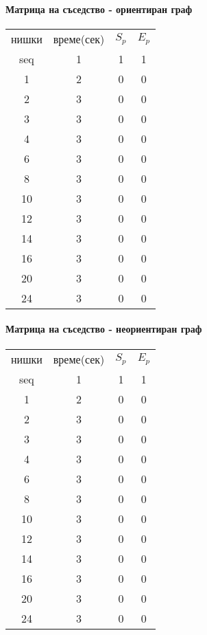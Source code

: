 \paragraph*{Матрица на съседство - ориентиран граф}

\begin{center}
\begin{tabular}{ c c c c }
  нишки & време(сек) & $S_p$ & $E_p$ \\
  seq & 1 & 1 & 1 \\
  1 & 2 & 0 & 0 \\
  2 & 3 & 0 & 0 \\
  3 & 3 & 0 & 0 \\
  4 & 3 & 0 & 0 \\
  6 & 3 & 0 & 0 \\
  8 & 3 & 0 & 0 \\
  10 & 3 & 0 & 0 \\
  12 & 3 & 0 & 0 \\
  14 & 3 & 0 & 0 \\
  16 & 3 & 0 & 0 \\
  20 & 3 & 0 & 0 \\
  24 & 3 & 0 & 0 \\
\end{tabular}
\end{center}

\paragraph*{Матрица на съседство - неориентиран граф}

\begin{center}
\begin{tabular}{ c c c c }
  нишки & време(сек) & $S_p$ & $E_p$ \\
  seq & 1 & 1 & 1 \\
  1 & 2 & 0 & 0 \\
  2 & 3 & 0 & 0 \\
  3 & 3 & 0 & 0 \\
  4 & 3 & 0 & 0 \\
  6 & 3 & 0 & 0 \\
  8 & 3 & 0 & 0 \\
  10 & 3 & 0 & 0 \\
  12 & 3 & 0 & 0 \\
  14 & 3 & 0 & 0 \\
  16 & 3 & 0 & 0 \\
  20 & 3 & 0 & 0 \\
  24 & 3 & 0 & 0 \\
\end{tabular}
\end{center}
